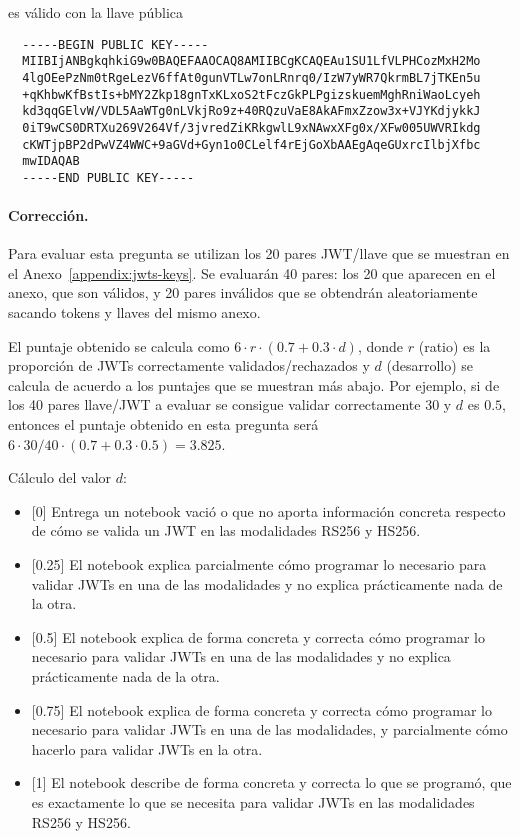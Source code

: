 es válido con la llave pública

\begin{verbatim}
  -----BEGIN PUBLIC KEY-----
  MIIBIjANBgkqhkiG9w0BAQEFAAOCAQ8AMIIBCgKCAQEAu1SU1LfVLPHCozMxH2Mo
  4lgOEePzNm0tRgeLezV6ffAt0gunVTLw7onLRnrq0/IzW7yWR7QkrmBL7jTKEn5u
  +qKhbwKfBstIs+bMY2Zkp18gnTxKLxoS2tFczGkPLPgizskuemMghRniWaoLcyeh
  kd3qqGElvW/VDL5AaWTg0nLVkjRo9z+40RQzuVaE8AkAFmxZzow3x+VJYKdjykkJ
  0iT9wCS0DRTXu269V264Vf/3jvredZiKRkgwlL9xNAwxXFg0x/XFw005UWVRIkdg
  cKWTjpBP2dPwVZ4WWC+9aGVd+Gyn1o0CLelf4rEjGoXbAAEgAqeGUxrcIlbjXfbc
  mwIDAQAB
  -----END PUBLIC KEY----- 
\end{verbatim}

\medskip

\paragraph{Corrección.}
Para evaluar esta pregunta se utilizan los 20 pares JWT/llave que se muestran en el Anexo~\ref{appendix:jwts-keys}. Se evaluarán 40 pares: los 20 que aparecen en el anexo, que son válidos, y 20 pares inválidos que se obtendrán aleatoriamente sacando tokens y llaves del mismo anexo.

El puntaje obtenido se calcula como $6\cdot r\cdot (0.7 + 0.3\cdot d)$, donde $r$ (ratio) es la proporción de JWTs correctamente validados/rechazados y $d$ (desarrollo) se calcula de acuerdo a los puntajes que se muestran más abajo. Por ejemplo, si de los 40 pares llave/JWT a evaluar se consigue validar correctamente 30 y $d$ es $0.5$, entonces el puntaje obtenido en esta pregunta será $6\cdot 30/40 \cdot (0.7 + 0.3\cdot 0.5) = 3.825$.

Cálculo del valor $d$:
\begin{itemize}
  \item{[0]} Entrega un notebook vació o que no aporta información concreta respecto de cómo se valida un JWT en las modalidades RS256 y HS256.
  \item{[0.25]} El notebook explica parcialmente cómo programar lo necesario para validar JWTs en una de las modalidades y no explica prácticamente nada de la otra.
  \item{[0.5]} El notebook explica de forma concreta y correcta cómo programar lo necesario para validar JWTs en una de las modalidades y no explica prácticamente nada de la otra.
  \item{[0.75]} El notebook explica de forma concreta y correcta cómo programar lo necesario para validar JWTs en una de las modalidades, y parcialmente cómo hacerlo para validar JWTs en la otra.
  \item{[1]} El notebook describe de forma concreta y correcta lo que se programó, que es exactamente lo que se necesita para validar JWTs en las modalidades RS256 y HS256.
\end{itemize}

\medskip

